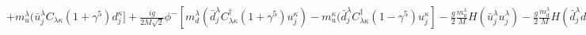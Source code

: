 \begin{math}
+m^{\lambda}_{u}(\bar{u}^{\lambda}_{j}C_{\lambda\kappa}(1+\gamma^{5})d^{\kappa}_{j}]
+\frac{ig}{2M\sqrt{2}}\phi^{-}
[m^{\lambda}_{d}(\bar{d}^{\lambda}_{j}C^{\dagger}_{\lambda\kappa}(1+\gamma^{5})u^{\kappa}_{j})
-m^{\kappa}_{u}(\bar{d}^{\lambda}_{j}C^{\dagger}_{\lambda\kappa}(1-\gamma^{5})u^{\kappa}_{j}]
-\frac{g}{2}\frac{m^{\lambda}_{u}}{M}H(\bar{u}^{\lambda}_{j}u^{\lambda}_{j})
-\frac{g}{2}\frac{m^{\lambda}_{d}}{M}H(\bar{d}^{\lambda}_{j}d^{\lambda}_{j})
+\frac{ig}{2}\frac{m^{\lambda}_{u}}{M}\phi^{0}(\bar{u}^{\lambda}_{j}\gamma^{5}u^{\lambda}_{j})
-\frac{ig}{2}\frac{m^{\lambda}_{d}}{M}\phi^{0}(\bar{d}^{\lambda}_{j}\gamma^{5}d^{\lambda}_{j})
+\bar{X}^{+}(\partial^{2}-M^{2})X^{+}+\bar{X}^{-}(\partial^{2}-M^{2})X^{-}
+\bar{X}^{0}(\partial^{2}-\frac{M^{2}}{c^{2}_{w}})X^{0}+\bar{Y}\partial^{2}Y
+igc_{w}W^{+}_{\mu}(\partial_{\mu}\bar{X}^{0}X^{-}-\partial_{\mu}\bar{X}^{+}X^{0})
+igs_{w}W^{+}_{\mu}(\partial_{\mu}\bar{Y}X^{-}-\partial_{\mu}\bar{X}^{+}Y)
+igc_{w}W^{-}_{\mu}(\partial_{\mu}\bar{X}^{-}X^{0}-\partial_{\mu}\bar{X}^{0}X^{+})
+igs_{w}W^{-}_{\mu}(\partial_{\mu}\bar{X}^{-}Y-\partial_{\mu}\bar{Y}X^{+})
+igc_{w}Z^{0}_{\mu}(\partial_{\mu}\bar{X}^{+}X^{+}-\partial_{\mu}\bar{X}^{-}X^{-})
+igs_{w}A_{\mu}(\partial_{\mu}\bar{X}^{+}X^{+}-\partial_{\mu}\bar{X}^{-}X^{-})
-\frac{1}{2}gM[\bar{X}^{+}X^{+}H+\bar{X}^{-}X^{-}H+\frac{1}{c^{2}_{w}}\bar{X}^{0}X^{0}H]
+\frac{1-2c^{2}_{w}}{2c_{w}}igM[\bar{X}^{+}X^{0}\phi^{+}-\bar{X}^{-}X^{0}\phi^{-}]
+\frac{1}{2c_{w}}igM[\bar{X}^{0}X^{-}\phi^{+}-\bar{X}^{0}X^{+}\phi^{-}]
+igMs_{w}[\bar{X}^{0}X^{-}\phi^{+}-\bar{X}^{0}X^{+}\phi^{-}]
+\frac{1}{2}igM[\bar{X}^{+}X^{+}\phi^{0}-\bar{X}^{-}X^{-}\phi^{0}]
\end{math}


